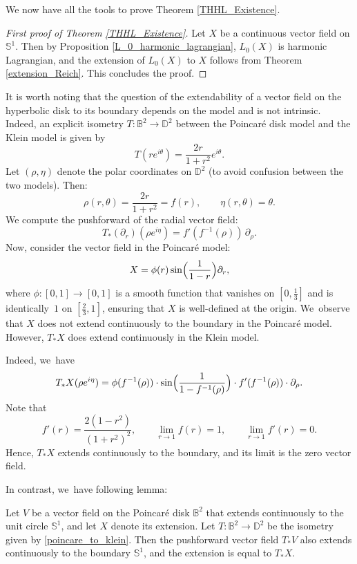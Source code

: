 We now have all the tools to prove Theorem \ref{THHL_Existence}.
\begin{proof}[First proof of Theorem \ref{THHL_Existence}]
Let $X$ be a continuous vector field on $\mathbb{S}^1$. Then by Proposition \ref{L_0_harmonic_lagrangian}, $L_0(X)$ is harmonic Lagrangian, and the extension of $L_0(X)$ to $X$ follows from Theorem \ref{extension_Reich}. This concludes the proof.
\end{proof}
It is worth noting that the question of the extendability of a vector field on the hyperbolic disk to its boundary depends on the model and is not intrinsic. Indeed, an explicit isometry $T:\mathbb{B}^2 \to \mathbb{D}^2$ between the Poincaré disk model and the Klein model is given by
\begin{equation}\label{poincare_to_klein}
T(re^{i\theta}) = \frac{2r}{1 + r^2} e^{i\theta}.
\end{equation}
Let \((\rho, \eta)\) denote the polar coordinates on \(\mathbb{D}^2\) (to avoid confusion between the two models). Then:
\[
\rho(r, \theta) = \frac{2r}{1 + r^2} = f(r), \qquad \eta(r, \theta) = \theta.
\]
We compute the pushforward of the radial vector field:
\[
T_*(\partial_r)(\rho e^{i\eta}) = f'(f^{-1}(\rho))\, \partial_\rho.
\]
Now, consider the vector field in the Poincaré model:
\[
X = \phi(r) \sin\Bigl(\frac{1}{1 - r}\Bigr) \partial_r,
\]
where \(\phi : [0, 1] \to [0, 1]\) is a smooth function that vanishes on \([0, \tfrac{1}{3}]\) and is identically~\(1\) on \([\tfrac{2}{3}, 1]\), ensuring that \(X\) is well-defined at the origin. We~observe that \(X\) does not extend continuously to the boundary in the Poincaré model. However, \(T_*X\) does extend continuously in the Klein model.

Indeed, we~have
\[
T_*X(\rho e^{i\eta}) = \phi(f^{-1}(\rho)) \cdot \sin\Bigl(\frac{1}{1 - f^{-1}(\rho)}\Bigr) \cdot f'(f^{-1}(\rho)) \cdot \partial_\rho.
\]
Note that
\[
f'(r) = \frac{2(1 - r^2)}{(1 + r^2)^2}, \qquad
\lim_{r \to 1} f(r) = 1, \qquad \lim_{r \to 1} f'(r) = 0.
\]
Hence, \(T_*X\) extends continuously to the boundary, and its limit is the zero vector field.

In contrast, we~have following lemma:

\begin{lemma}\label{extension_B_to_D}
Let \(V\) be a vector field on the Poincaré disk \(\mathbb{B}^2\) that extends continuously to the unit circle \(\mathbb{S}^1\), and let \(X\) denote its extension. Let \(T:\mathbb{B}^2 \to \mathbb{D}^2\) be the isometry given by \eqref{poincare_to_klein}. Then the pushforward vector field \(T_*V\) also extends continuously to the boundary \(\mathbb{S}^1\), and the extension is equal to \(T_*X\).
\end{lemma}

